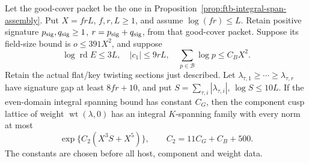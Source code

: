 \begin{srproposition}
\label{prop:ftb-arbitrary-weight-short-span}
Let the good-cover packet be the one in
Proposition~\ref{prop:ftb-integral-span-assembly}.
Put \(X=frL\), \(f,r,L\ge1\), and assume
\(\log(fr)\le L\).  Retain positive signature
\(p_{\rm sig},q_{\rm sig}\ge1\), \(r=p_{\rm sig}+q_{\rm sig}\),
from that good-cover packet.
Suppose its field-size bound is \(o\le391X^2\), and suppose
\[
 \log\operatorname{rd}E\le3L,\quad
 |c_1|\le9rL,\quad
 \sum_{p\in\mathcal B}\log p\le C_BX^2 .
\]
Retain the actual flat/key twisting sections just described.
Let \(\lambda_{\tau,1}\ge\cdots\ge\lambda_{\tau,r}\) have
signature gap at least \(8fr+10\), and put
\(S=\sum_{\tau,i}|\lambda_{\tau,i}|\), \(\log S\le10L\).
If the even-domain integral spanning bound has constant \(C_G\),
then the component cusp lattice of weight
\(\operatorname{wt}(\lambda,0)\) has an integral \(K\)-spanning
family with every norm at most
\[
                  \exp\{C_2(X^3S+X^5)\},
                   \qquad C_2=11C_G+C_B+500 .
\]
The constants are chosen before all host, component and weight
data.
\end{srproposition}
